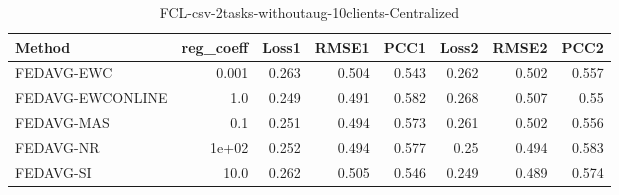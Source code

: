\begin{table}
\caption{FCL-csv-2tasks-withoutaug-10clients-Centralized}
\begin{tabular}{lrrrrrrr}
\toprule
Method & reg_coeff & Loss1 & RMSE1 & PCC1 & Loss2 & RMSE2 & PCC2 \\
\midrule
FEDAVG-EWC & 0.001 & 0.263 & 0.504 & 0.543 & 0.262 & 0.502 & 0.557 \\
FEDAVG-EWCONLINE & 1.0 & 0.249 & 0.491 & 0.582 & 0.268 & 0.507 & 0.55 \\
FEDAVG-MAS & 0.1 & 0.251 & 0.494 & 0.573 & 0.261 & 0.502 & 0.556 \\
FEDAVG-NR & 1e+02 & 0.252 & 0.494 & 0.577 & 0.25 & 0.494 & 0.583 \\
FEDAVG-SI & 10.0 & 0.262 & 0.505 & 0.546 & 0.249 & 0.489 & 0.574 \\
\bottomrule
\end{tabular}
\end{table}
